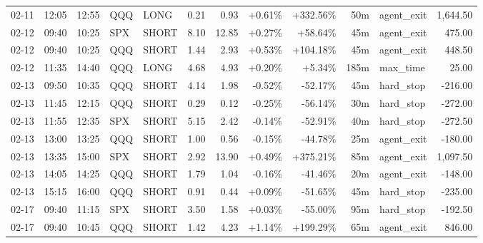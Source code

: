 \documentclass[11pt,a4paper,twoside]{article}
\begin{document}
\begin{center}
\begin{longtable}{>{\color{txtmain}}l l l l l r r r r r >{\color{txtmain}}l r}
02-11 & 12:05 & 12:55 & QQQ & LONG & 0.21 & 0.93 & \textcolor{wingreen}{+0.61\%} & \textcolor{wingreen}{+332.56\%} & 50m & agent\_exit & \textcolor{wingreen}{1,644.50} \\
02-12 & 09:40 & 10:25 & SPX & SHORT & 8.10 & 12.85 & \textcolor{wingreen}{+0.27\%} & \textcolor{wingreen}{+58.64\%} & 45m & agent\_exit & \textcolor{wingreen}{475.00} \\
02-12 & 09:40 & 10:25 & QQQ & SHORT & 1.44 & 2.93 & \textcolor{wingreen}{+0.53\%} & \textcolor{wingreen}{+104.18\%} & 45m & agent\_exit & \textcolor{wingreen}{448.50} \\
02-12 & 11:35 & 14:40 & QQQ & LONG & 4.68 & 4.93 & \textcolor{wingreen}{+0.20\%} & \textcolor{wingreen}{+5.34\%} & 185m & max\_time & \textcolor{wingreen}{25.00} \\
02-13 & 09:50 & 10:35 & QQQ & SHORT & 4.14 & 1.98 & \textcolor{lossred}{-0.52\%} & \textcolor{lossred}{-52.17\%} & 45m & hard\_stop & \textcolor{lossred}{-216.00} \\
02-13 & 11:45 & 12:15 & QQQ & SHORT & 0.29 & 0.12 & \textcolor{lossred}{-0.25\%} & \textcolor{lossred}{-56.14\%} & 30m & hard\_stop & \textcolor{lossred}{-272.00} \\
02-13 & 11:55 & 12:35 & SPX & SHORT & 5.15 & 2.42 & \textcolor{lossred}{-0.14\%} & \textcolor{lossred}{-52.91\%} & 40m & hard\_stop & \textcolor{lossred}{-272.50} \\
02-13 & 13:00 & 13:25 & QQQ & SHORT & 1.00 & 0.56 & \textcolor{lossred}{-0.15\%} & \textcolor{lossred}{-44.78\%} & 25m & agent\_exit & \textcolor{lossred}{-180.00} \\
02-13 & 13:35 & 15:00 & SPX & SHORT & 2.92 & 13.90 & \textcolor{wingreen}{+0.49\%} & \textcolor{wingreen}{+375.21\%} & 85m & agent\_exit & \textcolor{wingreen}{1,097.50} \\
02-13 & 14:05 & 14:25 & QQQ & SHORT & 1.79 & 1.04 & \textcolor{lossred}{-0.16\%} & \textcolor{lossred}{-41.46\%} & 20m & agent\_exit & \textcolor{lossred}{-148.00} \\
02-13 & 15:15 & 16:00 & QQQ & SHORT & 0.91 & 0.44 & \textcolor{wingreen}{+0.09\%} & \textcolor{lossred}{-51.65\%} & 45m & hard\_stop & \textcolor{lossred}{-235.00} \\
02-17 & 09:40 & 11:15 & SPX & SHORT & 3.50 & 1.58 & \textcolor{wingreen}{+0.03\%} & \textcolor{lossred}{-55.00\%} & 95m & hard\_stop & \textcolor{lossred}{-192.50} \\
02-17 & 09:40 & 10:45 & QQQ & SHORT & 1.42 & 4.23 & \textcolor{wingreen}{+1.14\%} & \textcolor{wingreen}{+199.29\%} & 65m & agent\_exit & \textcolor{wingreen}{846.00} \\

\end{longtable}
\end{center}
\end{document}
